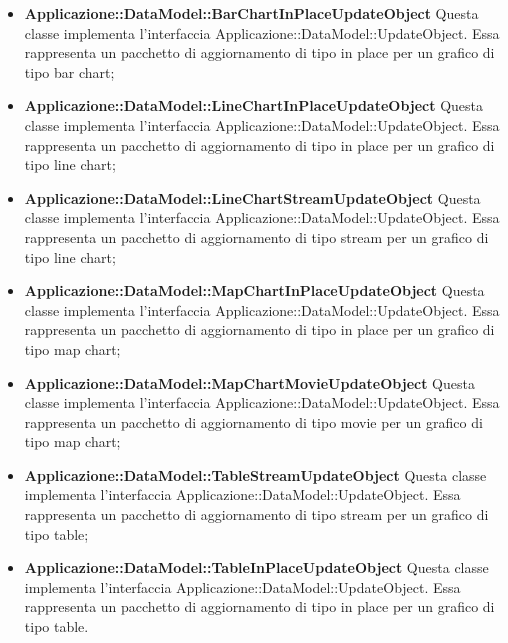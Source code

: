 \begin{itemize}
		\item \textbf{Applicazione::DataModel::BarChartInPlaceUpdateObject} Questa classe implementa l'interfaccia Applicazione::DataModel::UpdateObject. Essa rappresenta un pacchetto di aggiornamento di tipo in place per un grafico di tipo bar chart;

		\item \textbf{Applicazione::DataModel::LineChartInPlaceUpdateObject} Questa classe implementa l'interfaccia Applicazione::DataModel::UpdateObject. Essa rappresenta un pacchetto di aggiornamento di tipo in place per un grafico di tipo line chart;

		\item \textbf{Applicazione::DataModel::LineChartStreamUpdateObject} Questa classe implementa l'interfaccia Applicazione::DataModel::UpdateObject. Essa rappresenta un pacchetto di aggiornamento di tipo stream per un grafico di tipo line chart;

		\item \textbf{Applicazione::DataModel::MapChartInPlaceUpdateObject} Questa classe implementa l'interfaccia Applicazione::DataModel::UpdateObject. Essa rappresenta un pacchetto di aggiornamento di tipo in place per un grafico di tipo map chart;

		\item \textbf{Applicazione::DataModel::MapChartMovieUpdateObject} Questa classe implementa l'interfaccia Applicazione::DataModel::UpdateObject. Essa rappresenta un pacchetto di aggiornamento di tipo movie per un grafico di tipo map chart;

		\item \textbf{Applicazione::DataModel::TableStreamUpdateObject} Questa classe implementa l'interfaccia Applicazione::DataModel::UpdateObject. Essa rappresenta un pacchetto di aggiornamento di tipo stream per un grafico di tipo table;

		\item \textbf{Applicazione::DataModel::TableInPlaceUpdateObject} Questa classe implementa l'interfaccia Applicazione::DataModel::UpdateObject. Essa rappresenta un pacchetto di aggiornamento di tipo in place per un grafico di tipo table.
	\end{itemize}
